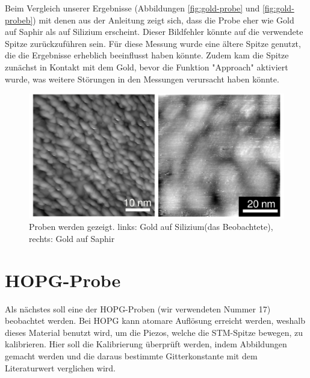 \documentclass{article}
\begin{document}
Beim Vergleich unserer Ergebnisse (Abbildungen \ref*{fig:gold-probe} und \ref*{fig:gold-probeb}) mit denen 
aus der Anleitung \cite{Anleitung} zeigt sich, dass die Probe eher wie Gold auf Saphir als auf Silizium erscheint. 
Dieser Bildfehler könnte auf die verwendete Spitze zurückzuführen sein. Für diese Messung wurde eine ältere 
Spitze genutzt, die die Ergebnisse erheblich beeinflusst haben könnte. Zudem kam die Spitze zunächst in Kontakt 
mit dem Gold, bevor die Funktion "Approach" aktiviert wurde, was weitere Störungen in den Messungen verursacht 
haben könnte.


\begin{figure}[h!]
    \centering
    \includegraphics[width=.45\linewidth]{Gold_vergleich}
    \caption{Proben werden gezeigt. links: Gold auf Silizium(das Beobachtete), rechts: Gold auf Saphir}
    \label{fig:goldkugel_vergleich}
  \end{figure}



\newpage

\section{HOPG-Probe}
Als nächstes soll eine der HOPG-Proben (wir verwendeten Nummer 17) beobachtet werden.
Bei HOPG kann atomare Auflösung erreicht werden, weshalb dieses Material benutzt wird, um die Piezos, welche die STM-Spitze
bewegen, zu kalibrieren. Hier soll die Kalibrierung überprüft werden, indem Abbildungen gemacht werden und die daraus
bestimmte Gitterkonstante mit dem Literaturwert verglichen wird.
\end{document}

